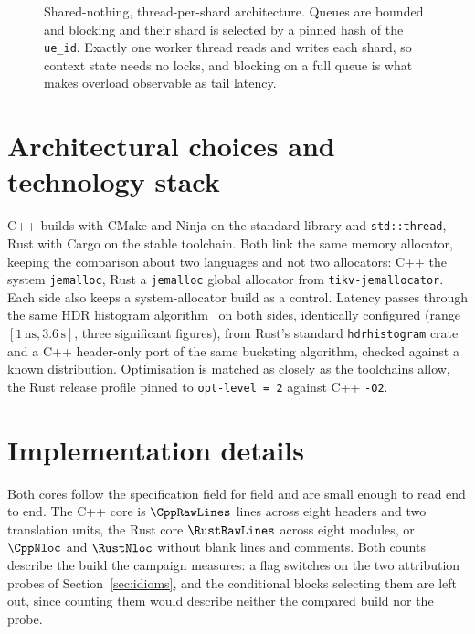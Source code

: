 \begin{figure}[ht]
\caption[Shared-nothing, thread-per-shard architecture]{Shared-nothing, thread-per-shard architecture. Queues are bounded and blocking and their
shard is selected by a pinned hash of the \texttt{ue\_id}. Exactly one worker thread reads and
writes each shard, so context state needs no locks, and blocking on a full queue is what makes
overload observable as tail latency.\label{fig:arch}}
\end{figure}

\section{Architectural choices and technology stack}
C++ builds with CMake and Ninja on the standard library and \texttt{std::thread}, Rust with Cargo
on the stable toolchain. Both link the same memory allocator, keeping the comparison about two
languages and not two allocators: C++ the system \texttt{jemalloc}, Rust a \texttt{jemalloc}
global allocator from \texttt{tikv-jemallocator}. Each side also keeps a system-allocator build
as a control. Latency passes through the same HDR histogram
algorithm~\cite{tene_hdrhistogram} on both sides, identically configured (range
$[1\,\text{ns}, 3.6\,\text{s}]$, three significant figures), from Rust's standard
\texttt{hdrhistogram} crate and a C++ header-only port of the same bucketing algorithm, checked
against a known distribution. Optimisation is matched as closely as the toolchains allow, the
Rust release profile pinned to \texttt{opt-level~=~2} against C++ \texttt{-O2}.

\section{Implementation details}\label{sec:impldetails}
\label{sec:impl}
Both cores follow the specification field for field and are small enough to read end to end.
The C++ core is $\CppRawLines$ lines across eight headers and two translation units, the Rust core
$\RustRawLines$ across eight modules, or $\CppNloc$ and $\RustNloc$ without blank lines and
comments. Both counts describe the build the campaign measures: a flag switches on the two
attribution probes of Section~\ref{sec:idioms}, and the conditional blocks selecting them are
left out, since counting them would describe neither the compared build nor the probe.


